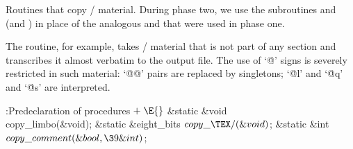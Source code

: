 Routines that copy \TEX/ material.
During phase two, we use the subroutines  and \PB{$%
\copyxTeX$} (and
) in place of the analogous  and %
\PB{$\skipxTeX$}
that were used in phase one.

The  routine, for example, takes \TEX/ material that is not
part of any section and transcribes it almost verbatim to the output file.
The use of `\.{@}' signs is severely restricted in such material:
`\.{@@}' pairs are replaced by singletons; `\.{@l}' and `\.{@q}' and
`\.{@s}' are interpreted.

\Y\B\4:Predeclaration of procedures\X${}\mathrel+\E{}$\6
\&{static} \&{void} \\{copy\_limbo}(\&{void});\6
\&{static} \&{eight\_bits} ${}\copyxTeX(\&{void}){}$;\6
\&{static} \&{int} ${}\\{copy\_comment}(\&{bool},\39\&{int}){}$;\par
\fi

